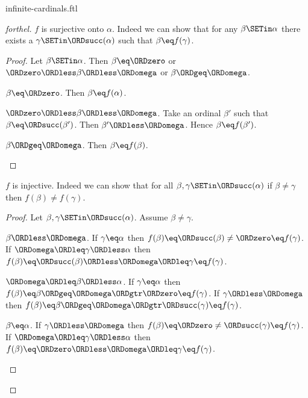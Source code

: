 \documentclass{stex}
\begin{document}
\begin{smodule}{infinite-cardinals.ftl}
\begin{proof}[forthel]
  $f$ is surjective onto $\alpha$.
  Indeed we can show that for any $\beta \SETin \alpha$ there exists a
  $\gamma \SETin \ORDsucc(\alpha)$ such that $\beta \eq f(\gamma)$.
  \begin{proof}
    Let $\beta \SETin \alpha$.
    Then $\beta \eq \ORDzero$ or $\ORDzero \ORDless \beta \ORDless \ORDomega$ or $\beta \ORDgeq \ORDomega$.

    \begin{case}{$\beta \eq \ORDzero$.}
      Then $\beta \eq f(\alpha)$.
    \end{case}

    \begin{case}{$\ORDzero \ORDless \beta \ORDless \ORDomega$.}
      Take an ordinal $\beta'$ such that $\beta \eq \ORDsucc(\beta')$.
      Then $\beta' \ORDless \ORDomega$.
      Hence $\beta \eq f(\beta')$.
    \end{case}

    \begin{case}{$\beta \ORDgeq \ORDomega$.}
      Then $\beta \eq f(\beta)$.
    \end{case}
  \end{proof}

  $f$ is injective.
  Indeed we can show that for all $\beta, \gamma \SETin \ORDsucc(\alpha)$ if
  $\beta \neq \gamma$ then $f(\beta) \neq f(\gamma)$.
  \begin{proof}
    Let $\beta, \gamma \SETin \ORDsucc(\alpha)$.
    Assume $\beta \neq \gamma$.

    \begin{case}{$\beta \ORDless \ORDomega$.}
      If $\gamma \eq \alpha$ then
      $f(\beta)
        \eq \ORDsucc(\beta)
        \neq \ORDzero
        \eq f(\gamma)$.
      If $\ORDomega \ORDleq \gamma \ORDless \alpha$ then
      $f(\beta)
        \eq \ORDsucc(\beta)
        \ORDless \ORDomega
        \ORDleq \gamma
        \eq f(\gamma)$.
    \end{case}

    \begin{case}{$\ORDomega \ORDleq \beta \ORDless \alpha$.}
      If $\gamma \eq \alpha$ then
      $f(\beta)
        \eq \beta
        \ORDgeq \ORDomega
        \ORDgtr \ORDzero
        \eq f(\gamma)$.
      If $\gamma \ORDless \ORDomega$ then
      $f(\beta)
        \eq \beta
        \ORDgeq \ORDomega
        \ORDgtr \ORDsucc(\gamma)
        \eq f(\gamma)$.
    \end{case}

    \begin{case}{$\beta \eq \alpha$.}
      If $\gamma \ORDless \ORDomega$ then
      $f(\beta)
        \eq \ORDzero
        \neq \ORDsucc(\gamma)
        \eq f(\gamma)$.
      If $\ORDomega \ORDleq \gamma \ORDless \alpha$ then
      $f(\beta)
        \eq \ORDzero
        \ORDless \ORDomega
        \ORDleq \gamma
        \eq f(\gamma)$.
    \end{case}
  \end{proof}


\end{proof}
\end{smodule}
\end{document}
